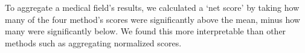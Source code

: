 \documentclass[11pt,a4paper]{article}
\begin{document}
To aggregate a medical field's results, we calculated a `net score' by taking how many of the four method's scores were significantly above the mean, minus how many were significantly below. We found this more interpretable than other methods such as aggregating normalized scores. 

%
%
%
%
%
%
%
\end{document}

